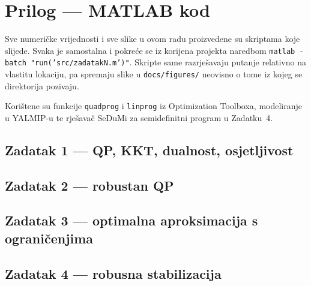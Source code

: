 
\section{Prilog --- MATLAB kod}
\label{sec:kod}

Sve numeričke vrijednosti i sve slike u ovom radu proizvedene su skriptama koje
slijede. Svaka je samostalna i pokreće se iz korijena projekta naredbom
\texttt{matlab -batch "run('src/zadatakN.m')"}. Skripte same razrješavaju
putanje relativno na vlastitu lokaciju, pa spremaju slike u \texttt{docs/figures/}
neovisno o tome iz kojeg se direktorija pozivaju.

Korištene su funkcije \texttt{quadprog} i \texttt{linprog} iz Optimization
Toolboxa, modeliranje u YALMIP-u te rješavač SeDuMi za semidefinitni program u
Zadatku~4.

\subsection{Zadatak 1 --- QP, KKT, dualnost, osjetljivost}
\label{sec:kod:z1}



\clearpage
\subsection{Zadatak 2 --- robustan QP}
\label{sec:kod:z2}



\clearpage
\subsection{Zadatak 3 --- optimalna aproksimacija s ograničenjima}
\label{sec:kod:z3}



\clearpage
\subsection{Zadatak 4 --- robusna stabilizacija}
\label{sec:kod:z4}


